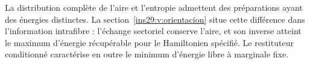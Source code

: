 La distribution complète de l’aire et l’entropie admettent des préparations ayant
des énergies distinctes. La section~\ref{ins29:v:orientacion} situe cette
différence dans l’information intrafibre : l’échange sectoriel conserve
l’aire, et son inverse atteint le maximum d’énergie récupérable pour le
Hamiltonien spécifié. Le restituteur conditionné caractérise en outre
le minimum d’énergie libre à marginale fixe.

